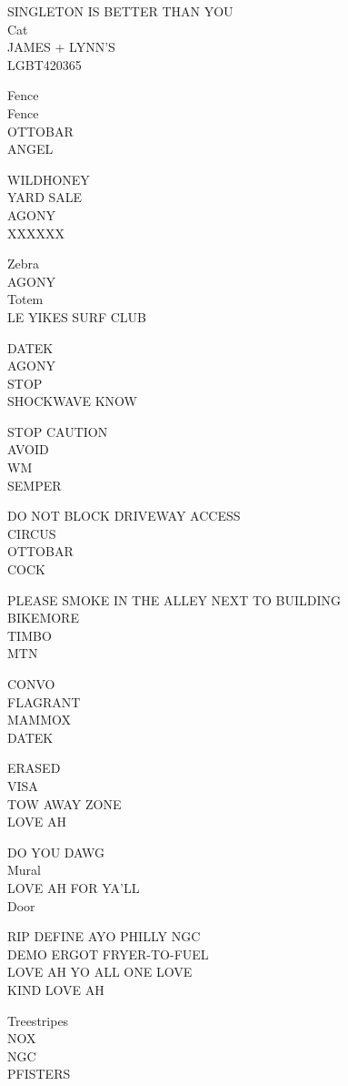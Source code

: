 \documentclass[10pt,letterpaper]{article}
\begin{document}
SINGLETON IS BETTER THAN YOU\\
Cat\\
JAMES + LYNN'S\\
LGBT420365

Fence\\
Fence\\
OTTOBAR\\
ANGEL

WILDHONEY\\
YARD SALE\\
AGONY\\
XXXXXX

Zebra\\
AGONY\\
Totem\\
LE YIKES SURF CLUB

DATEK\\
AGONY\\
STOP\\
SHOCKWAVE KNOW

STOP CAUTION\\
AVOID\\
WM\\
SEMPER

DO NOT BLOCK DRIVEWAY ACCESS\\
CIRCUS\\
OTTOBAR\\
COCK

PLEASE SMOKE IN THE ALLEY NEXT TO BUILDING\\
BIKEMORE\\
TIMBO\\
MTN

CONVO\\
FLAGRANT\\
MAMMOX\\
DATEK

ERASED\\
VISA\\
TOW AWAY ZONE\\
LOVE AH

DO YOU DAWG\\
Mural\\
LOVE AH FOR YA'LL\\
Door

RIP DEFINE AYO PHILLY NGC\\
DEMO ERGOT FRYER{-}TO{-}FUEL\\
LOVE AH YO ALL ONE LOVE\\
KIND LOVE AH

Treestripes\\
NOX\\
NGC\\
PFISTERS
\end{document}
